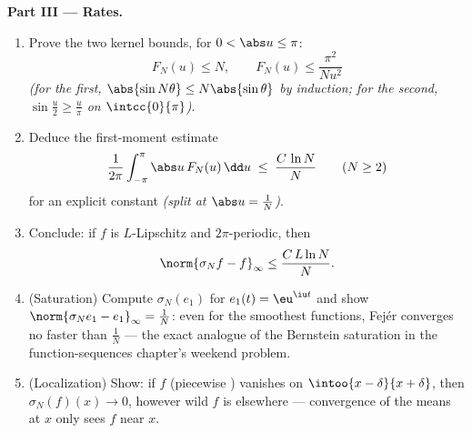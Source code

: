 \begin{problem}
\medskip
\noindent\textbf{Part III --- Rates.}
\begin{enumerate}[resume]
  \item Prove the two kernel bounds, for $0 < \abs u \leq
        \pi$:
        \[
        F_N(u) \leq N,
        \qquad
        F_N(u) \leq \frac{\pi^2}{N u^2}
        \]
        \emph{(for the first, $\abs{\sin N\theta} \leq
        N\abs{\sin\theta}$ by induction; for the second,
        $\sin\frac u2 \geq \frac{u}{\pi}$ on
        $\intcc{0}{\pi}$)}.
  \item Deduce the first-moment estimate
        \[
        \frac{1}{2\pi}\int_{-\pi}^{\pi}\abs u\,F_N(u)\,\dd u
        \;\leq\; \frac{C\,\ln N}{N}
        \qquad (N \geq 2)
        \]
        for an explicit constant \emph{(split at $\abs u =
        \frac1N$)}.
  \item Conclude: if $f$ is $L$-Lipschitz and $2\pi$-periodic,
        then
        \[
        \norm{\sigma_N f - f}_\infty \leq \frac{C\,L\ln N}{N} .
        \]
  \item (Saturation) Compute $\sigma_N(e_1)$ for $e_1(t) =
        \eu^{\iu t}$ and show $\norm{\sigma_Ne_1 - e_1}_\infty
        = \frac1N$: even for the smoothest functions, Fej\'er
        converges no faster than $\frac1N$ --- the exact
        analogue of the Bernstein saturation in the
        function-sequences chapter's weekend problem.
  \item (Localization) Show: if $f$ (piecewise )
        vanishes on $\intoo{x - \delta}{x + \delta}$, then
        $\sigma_N(f)(x) \to 0$, however wild $f$ is elsewhere
        --- convergence of the means at $x$ only sees $f$ near
        $x$.
\end{enumerate}


\end{problem}
